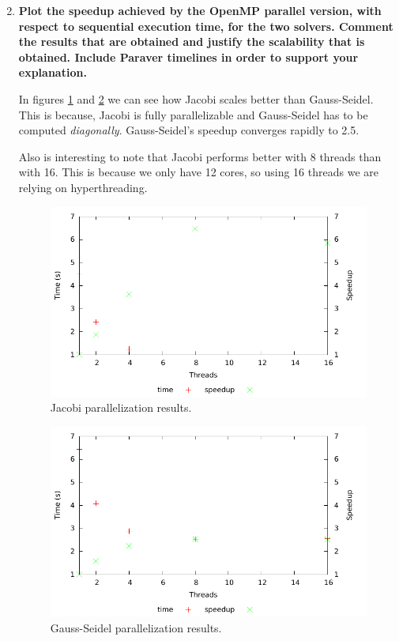 \documentclass[a4paper,11pt]{article}
\begin{document}
\begin{enumerate}
\setcounter{enumi}{1}
\item
\textbf{Plot the speedup achieved by the OpenMP parallel version, with
  respect to sequential execution time, for the two solvers. Comment
  the results that are obtained and justify the scalability that is
  obtained. Include Paraver timelines in order to support your
  explanation.}  \setcounter{enumi}{2}

In figures \ref{fig:j-plot} and \ref{fig:gs-plot} we can see how
Jacobi scales better than Gauss-Seidel. This is because, Jacobi is
fully parallelizable and Gauss-Seidel has to be computed \emph{diagonally}.
Gauss-Seidel's speedup converges rapidly to 2.5.

Also is interesting to note that Jacobi performs better with 8 threads
than with 16.  This is because we only have 12 cores, so using 16
threads we are relying on hyperthreading.

\begin{figure}[h!]
  \center
  \includegraphics[width=1.0\textwidth]{figs/plot_j.pdf}
  \caption{Jacobi parallelization results.}
  \label{fig:j-plot}
\end{figure}

\begin{figure}[h!]
  \center
  \includegraphics[width=1.0\textwidth]{figs/plot_gs.pdf}
  \caption{Gauss-Seidel parallelization results.}
  \label{fig:gs-plot}
\end{figure}


\end{enumerate}
\end{document}
